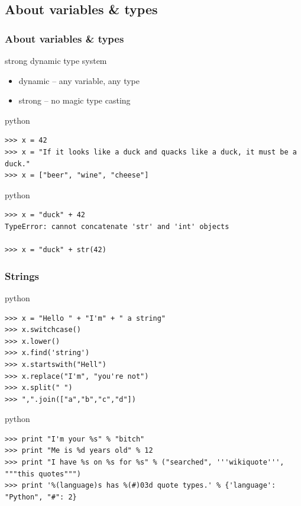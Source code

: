 \documentclass{beamer}
\begin{document}
\subsection{About variables \& types}
\begin{frame}[fragile]
	\frametitle{About variables \& types}
	\begin{block}{strong dynamic type system}
	\begin{itemize}
	\item dynamic -- any variable, any type
	\item strong -- no magic type casting
	\end{itemize}
	\end{block}
\pause
	\begin{exampleblock}{python}
	\begin{lstlisting}
>>> x = 42
>>> x = "If it looks like a duck and quacks like a duck, it must be a duck."
>>> x = ["beer", "wine", "cheese"]
	\end{lstlisting}
	\end{exampleblock}

\pause

	\begin{exampleblock}{python}
	\begin{lstlisting}
>>> x = "duck" + 42
TypeError: cannot concatenate 'str' and 'int' objects

>>> x = "duck" + str(42)
	\end{lstlisting}
	\end{exampleblock}
\end{frame}

\begin{frame}[fragile]
	\frametitle{Strings}
	
	\begin{exampleblock}{python}
	\begin{lstlisting}
>>> x = "Hello " + "I'm" + " a string"
>>> x.switchcase()
>>> x.lower()
>>> x.find('string')
>>> x.startswith("Hell")
>>> x.replace("I'm", "you're not")
>>> x.split(" ")
>>> ",".join(["a","b","c","d"])
	\end{lstlisting}
	\end{exampleblock}

\pause

	\begin{exampleblock}{python}
	\begin{lstlisting}
>>> print "I'm your %s" % "bitch"
>>> print "Me is %d years old" % 12
>>> print "I have %s on %s for %s" % ("searched", '''wikiquote''', """this quotes""")
>>> print '%(language)s has %(#)03d quote types.' % {'language': "Python", "#": 2}
	\end{lstlisting}
	\end{exampleblock}
\end{frame}
\end{document}
